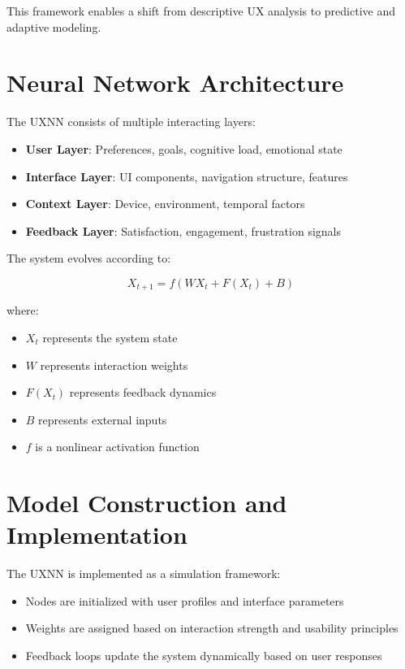 \documentclass[12pt]{article}
\begin{document}
This framework enables a shift from descriptive UX analysis to predictive and adaptive modeling.

\section{Neural Network Architecture}

The UXNN consists of multiple interacting layers:

\begin{itemize}
\item \textbf{User Layer}: Preferences, goals, cognitive load, emotional state
\item \textbf{Interface Layer}: UI components, navigation structure, features
\item \textbf{Context Layer}: Device, environment, temporal factors
\item \textbf{Feedback Layer}: Satisfaction, engagement, frustration signals
\end{itemize}

The system evolves according to:

\[
X_{t+1} = f(WX_t + F(X_t) + B)
\]

where:
\begin{itemize}
\item $X_t$ represents the system state
\item $W$ represents interaction weights
\item $F(X_t)$ represents feedback dynamics
\item $B$ represents external inputs
\item $f$ is a nonlinear activation function
\end{itemize}

\section{Model Construction and Implementation}

The UXNN is implemented as a simulation framework:

\begin{itemize}
\item Nodes are initialized with user profiles and interface parameters
\item Weights are assigned based on interaction strength and usability principles
\item Feedback loops update the system dynamically based on user responses
\end{itemize}
\end{document}
